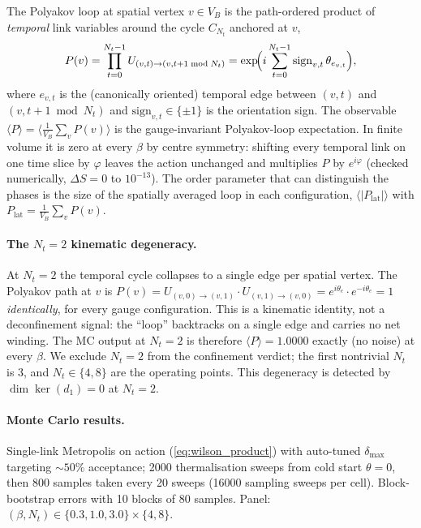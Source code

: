\documentclass[11pt]{article}
\begin{document}
The Polyakov loop at spatial vertex $v\in V_B$ is the path-ordered product of
\emph{temporal} link variables around the cycle $C_{N_t}$ anchored at $v$,
\begin{equation}
P(v)=\prod_{t=0}^{N_t-1}U_{(v,t)\to(v,t+1\bmod N_t)}
   =\exp\!\Bigl(i\sum_{t=0}^{N_t-1}\mathrm{sign}_{v,t}\,\theta_{e_{v,t}}\Bigr),
\end{equation}
where $e_{v,t}$ is the (canonically oriented) temporal edge between
$(v,t)$ and $(v,t+1\bmod N_t)$ and $\mathrm{sign}_{v,t}\in\{\pm 1\}$ is the
orientation sign. The observable
$\langle P\rangle=\langle\frac{1}{V_B}\sum_v P(v)\rangle$ is the
gauge-invariant Polyakov-loop expectation.  In finite volume it is zero
at every $\beta$ by centre symmetry: shifting every temporal link on one
time slice by $\varphi$ leaves the action unchanged and multiplies $P$ by
$e^{i\varphi}$ (checked numerically, $\Delta S = 0$ to $10^{-13}$).  The
order parameter that can distinguish the phases is the size of the
spatially averaged loop in each configuration,
$\langle |P_\text{lat}| \rangle$ with
$P_\text{lat} = \frac{1}{V_B}\sum_v P(v)$.

\paragraph{The $N_t=2$ kinematic degeneracy.} At $N_t=2$ the temporal cycle
collapses to a single edge per spatial vertex. The Polyakov path at $v$ is
$P(v)=U_{(v,0)\to(v,1)}\cdot U_{(v,1)\to(v,0)}=e^{i\theta_e}\cdot e^{-i\theta_e}=1$
\emph{identically}, for every gauge configuration. This is a kinematic
identity, not a deconfinement signal: the ``loop'' backtracks on a single
edge and carries no net winding. The MC output at $N_t=2$ is therefore
$\langle P\rangle=1.0000$ exactly (no noise) at every $\beta$. We exclude
$N_t=2$ from the confinement verdict; the first nontrivial $N_t$ is 3, and
$N_t\in\{4,8\}$ are the operating points. This degeneracy is detected by
$\dim\ker(d_1)=0$ at $N_t=2$.

\paragraph{Monte Carlo results.} Single-link Metropolis on action
(\ref{eq:wilson_product}) with auto-tuned $\delta_\text{max}$ targeting
$\sim 50\%$ acceptance; 2000 thermalisation sweeps from cold start
$\theta=0$, then 800 samples taken every 20 sweeps (16000 sampling sweeps
per cell). Block-bootstrap errors with 10 blocks of 80 samples. Panel:
$(\beta,N_t)\in\{0.3,1.0,3.0\}\times\{4,8\}$.
\end{document}
